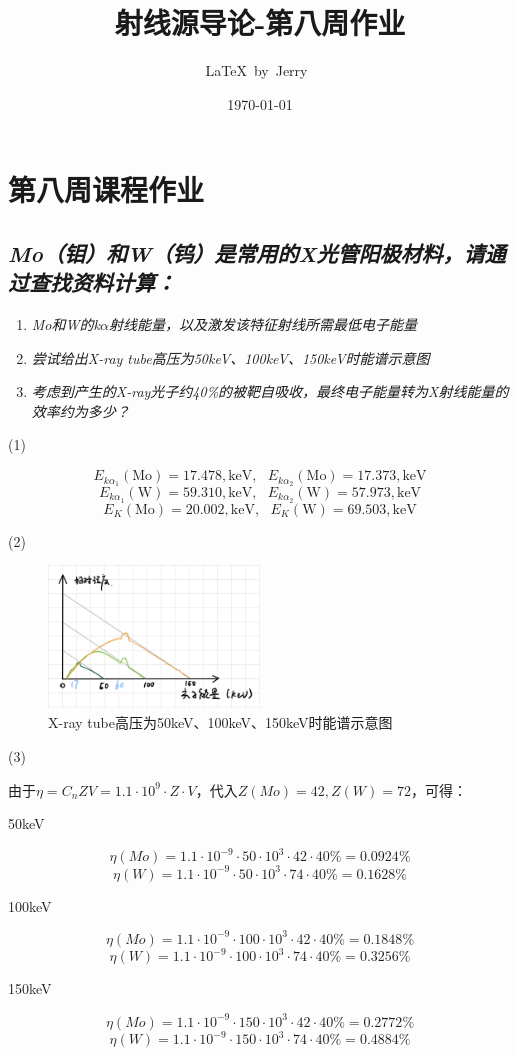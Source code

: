 \documentclass{article}
\title{射线源导论-第八周作业}
\author{\LaTeX\ by\ Jerry\ }
\date{\today}
\begin{document}
\pagestyle{fancy}

\fancyhead[R]{\today}

\section*{第八周课程作业}

\subsection*{\emph{Mo（钼）和W（钨）是常用的X光管阳极材料，请通过查找资料计算：}}

\begin{enumerate}
    \item \emph{Mo和W的k$\alpha$射线能量，以及激发该特征射线所需最低电子能量}
    \item \emph{尝试给出X-ray tube高压为50keV、100keV、150keV时能谱示意图}
    \item \emph{考虑到产生的X-ray光子约40\%的被靶自吸收，最终电子能量转为X射线能量的效率约为多少？}
\end{enumerate}

(1)

$$E_{k\alpha_1}(\text{Mo}) = 17.478 , \text{keV},\ \ \ E_{k\alpha_2}(\text{Mo}) = 17.373 , \text{keV}$$
$$E_{k\alpha_1}(\text{W}) = 59.310 , \text{keV},\ \ \ E_{k\alpha_2}(\text{W}) = 57.973 , \text{keV}$$
$$E_K(\text{Mo}) = 20.002 , \text{keV},\ \ \ E_K(\text{W}) = 69.503 , \text{keV}$$

(2)

\begin{figure}[htbp]
    \centering
    \includegraphics[width=0.5\textwidth]{./img/2.jpg}
    \caption{X-ray tube高压为50keV、100keV、150keV时能谱示意图}
    \label{fig:2}
\end{figure}

(3)

由于$\eta=C_{n}ZV=1.1\cdot10^{9}\cdot Z\cdot V$，代入$Z(Mo)=42,Z(W)=72$，可得：

50keV

$$\eta(Mo)=1.1\cdot10^{-9}\cdot50\cdot10^{3}\cdot42\cdot40\%=0.0924\%$$
$$\eta(W)=1.1\cdot10^{-9}\cdot50\cdot10^{3}\cdot74\cdot40\%=0.1628\%$$

100keV

$$\eta(Mo)=1.1\cdot10^{-9}\cdot100\cdot10^{3}\cdot42\cdot40\%=0.1848\%$$
$$\eta(W)=1.1\cdot10^{-9}\cdot100\cdot10^{3}\cdot74\cdot40\%=0.3256\%$$

150keV

$$\eta(Mo)=1.1\cdot10^{-9}\cdot150\cdot10^{3}\cdot42\cdot40\%=0.2772\%$$
$$\eta(W)=1.1\cdot10^{-9}\cdot150\cdot10^{3}\cdot74\cdot40\%=0.4884\%$$
\end{document}
